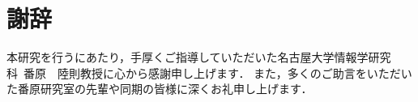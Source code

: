 \chapter*{謝辞}

本研究を行うにあたり，手厚くご指導していただいた名古屋大学情報学研究科~番原~~陸則教授に心から感謝申し上げます．
また，多くのご助言をいただいた番原研究室の先輩や同期の皆様に深くお礼申し上げます．


